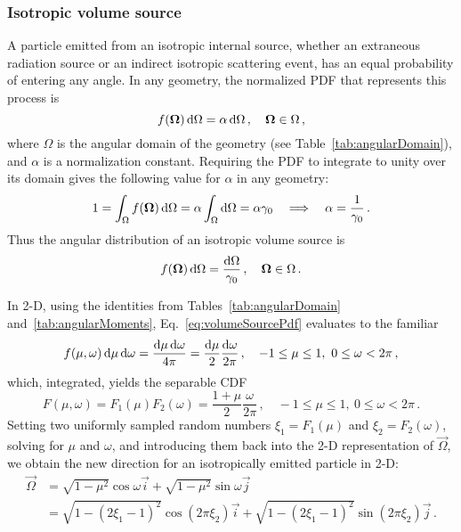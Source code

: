 \subsubsection{Isotropic volume source}
A particle emitted from an isotropic internal source, whether an extraneous
radiation source or an indirect isotropic scattering event, has an equal
probability of entering any angle. In any geometry, the normalized PDF that
represents this process is
\begin{equation*}
  f(\bm{\Omega}) \mathop{}\!\mathrm{d} \Omega = \alpha \mathop{}\!\mathrm{d} \Omega \,,
  \quad \bm{\Omega} \in \Omega \,,
\end{equation*}
where $\Omega$ is the angular domain of the
geometry (see Table~\ref{tab:angularDomain}), and $\alpha$ is a normalization
constant.
Requiring the PDF to integrate to unity over its domain gives the
following value for $\alpha$ in any geometry:
\begin{align*}
  1 = \int_{\Omega} f(\bm{\Omega}) \mathop{}\!\mathrm{d}\Omega
  = \alpha \int_{\Omega} \mathop{}\!\mathrm{d}\Omega = \alpha \gamma_0
  \quad \Longrightarrow \quad
  \alpha = \frac{1}{\gamma_0}\,.
\end{align*}
Thus the angular distribution of an isotropic volume source is
\begin{equation}\label{eq:volumeSourcePdf}
  f(\bm{\Omega}) \mathop{}\!\mathrm{d} \Omega = \frac{\mathop{}\!\mathrm{d}\Omega}{\gamma_0} \,,
  \quad \bm{\Omega} \in \Omega\,.
\end{equation}

In 2-D, using the identities from Tables~\ref{tab:angularDomain}
and~\ref{tab:angularMoments}, Eq.~\eqref{eq:volumeSourcePdf} evaluates to the
familiar
\begin{equation*}
  f(\mu,\omega) \mathop{}\!\mathrm{d}\mu\mathop{}\!\mathrm{d}\omega = \frac{\mathop{}\!\mathrm{d}\mu\mathop{}\!\mathrm{d}\omega}{4\pi} 
  = \frac{\mathop{}\!\mathrm{d}\mu}{2}\frac{\mathop{}\!\mathrm{d}\omega}{2\pi}
  \,,
  \quad -1\le \mu \le 1,\ 0 \le \omega < 2\pi\,,
\end{equation*}
which, integrated, yields the separable CDF
\begin{equation*}
  F(\mu,\omega) = F_1(\mu) F_2(\omega)
  = \frac{1 + \mu}{2}\frac{\omega}{2\pi}\,,
  \quad -1\le \mu \le 1,\ 0 \le \omega < 2\pi\,.
\end{equation*}
Setting two uniformly sampled random numbers $\xi_1 = F_1(\mu)$ and
$\xi_2 = F_2(\omega)$, solving for $\mu$ and $\omega$, and
introducing them back into the 2-D representation of $\vec{\Omega}$, we obtain the
new direction for an isotropically emitted particle in 2-D:
\begin{align*}
  \vec{\Omega} &= \sqrt{1-\mu^2} \cos \omega \vec{i}
  + \sqrt{1-\mu^2} \sin \omega \vec{j}
\\
  &= \sqrt{1-(2\xi_1-1)^2} \cos(2\pi\xi_2) \vec{i}
  + \sqrt{1-(2\xi_1-1)^2} \sin(2\pi\xi_2) \vec{j}\,.
\end{align*}


